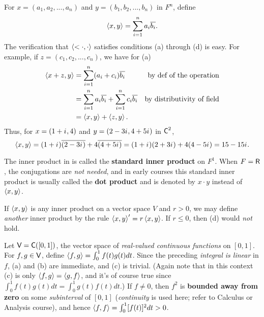 \begin{example} \label{example 6.1.1}
For \(x = (a_1, a_2, ..., a_n)\) and \(y = (b_1, b_2, ..., b_n)\) in \(F^n\), define
\[
    \left< x, y \right> = \sum_{i = 1}^n a_i \overline{b_i}.
\]
The verification that \(\left<< \cdot, \cdot \right>\) satisfies conditions (a) through (d) is easy.
For example, if \(z = (c_1, c_2, ..., c_n)\), we have for (a)
\begin{align*}
    \left< x + z, y \right> & = \sum_{i = 1}^n (a_i + c_i) \overline{b_i} & \text{by def of the operation} \\
    & = \sum_{i = 1}^n a_i \overline{b_i} + \sum_{i = 1}^n c_i \overline{b_i} & \text{by distributivity of field} \\
    & = \left< x, y \right> + \left< z, y \right>.
\end{align*}
Thus, for \(x = (1 + {i\mkern1mu}, 4)\) and \(y = (2 - 3{i\mkern1mu}, 4 + 5{i\mkern1mu})\) in \(\textsf{C}^2\),
\[
    \left< x, y \right> = (1 + {i\mkern1mu})\overline{(2 - 3{i\mkern1mu})} + 4\overline{(4 + 5{i\mkern1mu})} = (1 + {i\mkern1mu})(2 + 3{i\mkern1mu}) + 4(4 - 5{i\mkern1mu}) = 15 - 15{i\mkern1mu}.
\]
\end{example}

\begin{remark} \label{remark 6.1.2}
The inner product in  is called the \textbf{standard inner product} on \(F^1\).
When \(F = \textsf{R}\), the conjugations are \emph{not needed}, and in early courses this standard inner product is usually called the \textbf{dot product} and is denoted by \(x \cdot y\) instead of \(\left< x,y \right>\).
\end{remark}

\begin{example} \label{example 6.1.2}
If \(\left< x, y \right>\) is any inner product on a vector space \(V\) and \(r > 0\), we may define \emph{another} inner product by the rule \(\left< x, y \right>' = r \left< x, y \right>\).
If \(r \le 0\), then (d) would \emph{not} hold.
\end{example}

\begin{example} \label{example 6.1.3}
Let \(\textsf{V} = \textsf{C}([0, 1])\), the vector space of \emph{real-valued continuous functions} on \([0, 1]\).
For \(f, g \in \textsf{V}\), define \(\left< f, g \right> = \int_0^1 f(t)g(t) dt\).
Since the preceding \emph{integral is linear} in \(f\), (a) and (b) are immediate, and (c) is trivial.
(Again note that in this context (c) is only \(\left< f, g \right> = \left< g, f \right>\), and it's of course true since \(\int_0^1 f(t)g(t) dt = \int_0^1 g(t)f(t) dt\).)
If \(f \ne 0\), then \(f^2\) is \textbf{bounded away from zero} on some \emph{subinterval} of \([0, 1]\) (\emph{continuity} is used here; refer to Calculus or Analysis course), and hence \(\left< f, f \right> = \int_0^1 [f(t)]^2 dt > 0\).
\end{example}

